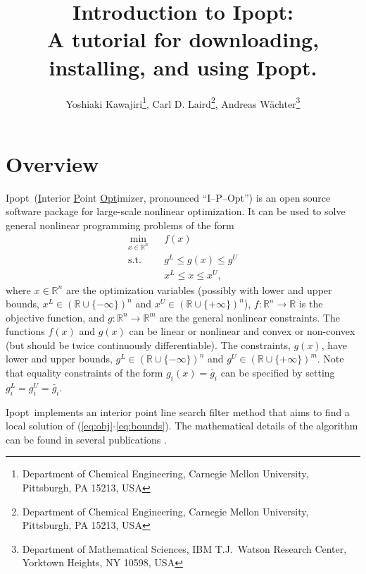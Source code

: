 \documentclass[letter,10pt]{article}
\newcommand{\RR}{{\mathbb{R}}}
\newcommand{\Ipopt}{{\sc Ipopt}}
\begin{document}
\title{Introduction to \Ipopt:\\
A tutorial for downloading, installing, and using \Ipopt.}

\author{Yoshiaki Kawajiri\footnote{Department of Chemical Engineering,
    Carnegie Mellon University, Pittsburgh, PA 15213, USA}, Carl D.
  Laird\footnote{Department of Chemical Engineering, Carnegie Mellon
    University, Pittsburgh, PA 15213, USA}, Andreas
  W\"achter\footnote{Department of Mathematical Sciences, IBM
    T.J.~Watson Research Center, Yorktown Heights, NY 10598, USA}}

\maketitle

\tableofcontents

\section{Overview}
\Ipopt\ (\underline{I}nterior \underline{P}oint \underline{Opt}imizer,
pronounced ``I--P--Opt'') is an open source software package for
large-scale nonlinear optimization. It can be used to solve general
nonlinear programming problems of the form
\begin{eqnarray}
\min_{x\in\RR^n} &&f(x) \label{eq:obj} \\
\mbox{s.t.} \;  &&g^L \leq g(x) \leq g^U \\
                &&x^L \leq x \leq x^U, \label{eq:bounds}
\end{eqnarray}
where $x \in \RR^n$ are the optimization variables (possibly with
lower and upper bounds, $x^L\in(\RR\cup\{-\infty\})^n$ and
$x^U\in(\RR\cup\{+\infty\})^n$), $f:\RR^n\longrightarrow\RR$ is the
objective function, and $g:\RR^n\longrightarrow \RR^m$ are the general
nonlinear constraints.  The functions $f(x)$ and $g(x)$ can be linear
or nonlinear and convex or non-convex (but should be twice
continuously differentiable). The constraints, $g(x)$, have lower and
upper bounds, $g^L\in(\RR\cup\{-\infty\})^n$ and
$g^U\in(\RR\cup\{+\infty\})^m$. Note that equality constraints of the
form $g_i(x)=\bar g_i$ can be specified by setting
$g^L_{i}=g^U_{i}=\bar g_i$.

\Ipopt\ implements an interior point line search filter method that
aims to find a local solution of (\ref{eq:obj}-\ref{eq:bounds}).  The mathematical details
of the algorithm can be found in several publications
\cite{NocWaeWal:adaptive,WaechterPhD,WaeBie:IpoptImpl,WaeBie05:filterglobal,WaeBie05:filterlocal}.
\end{document}

